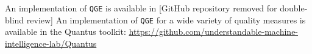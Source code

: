 \ifdefined\doubleblind
  An implementation of \texttt{QGE} is available in [GitHub repository removed for double-blind review]
\else
  An implementation of \texttt{QGE} for a wide variety of quality measures is available in the Quantus toolkit: \url{https://github.com/understandable-machine-intelligence-lab/Quantus}
\fi
